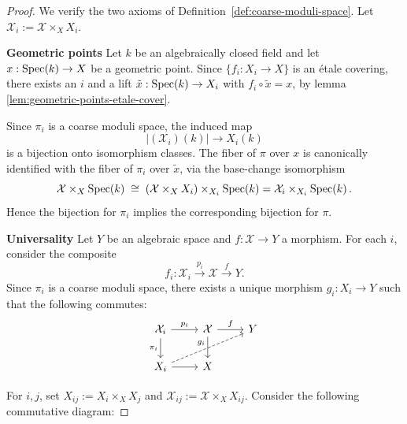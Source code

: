 \begin{proof}
	We verify the two axioms of Definition~\ref{def:coarse-moduli-space}.
	Let $\mathcal{X}_i := \mathcal{X} \times_X X_i$.
	
	\textbf{Geometric points}
	Let $k$ be an algebraically closed field and let
	$x : \operatorname{Spec}(k) \to X$ be a geometric point. Since $\{f_i : X_i \to X\}$
	is an étale covering, there exists an  $i$ and a lift
	$\tilde{x} : \operatorname{Spec}(k) \to X_i$ with $f_i \circ \tilde{x} = x$, by lemma \ref{lem:geometric-points-etale-cover}.
	
	Since $\pi_i$ is a coarse moduli space, the induced map
	\[
	|(\mathcal{X}_i)(k)| \longrightarrow X_i(k)
	\]
	is a bijection onto isomorphism classes. The fiber of $\pi$ over $x$
	is canonically identified with the fiber of $\pi_i$ over $\tilde{x}$,
	via the base-change isomorphism
	\[
	\mathcal{X} \times_X \operatorname{Spec}(k)
	\;\cong\;
	(\mathcal{X} \times_X X_i) \times_{X_i} \operatorname{Spec}(k) = \mathcal{X}_i\times_{X_i}\operatorname{Spec}\!\left(k\right).
	\]
	Hence the bijection for $\pi_i$ implies the corresponding bijection for
	$\pi$.
	
	\medskip
	\textbf{Universality}
	Let $Y$ be an algebraic space and $f : \mathcal{X} \to Y$ a morphism.
	For each $i$, consider the composite
	\[
	f_i: \mathcal{X}_i \xrightarrow{\;p_i\;} \mathcal{X}
	\xrightarrow{\;f\;} Y.
	\]
	Since $\pi_i$ is a coarse moduli space, there exists a unique morphism
	$g_i : X_i \to Y$ such that the following commutes:
	\begin{equation}\label{diag:extension-on-etale-cover-of-X}
		\begin{tikzcd}
			{\mathcal{X}_i} & {\mathcal{X}} & Y \\
			{X_i} & X
			\arrow["{p_i}", from=1-1, to=1-2]
			\arrow["{\pi_i}"', from=1-1, to=2-1]
			\arrow["f", from=1-2, to=1-3]
			\arrow[from=1-2, to=2-2]
			\arrow["{g_i}", dashed, from=2-1, to=1-3]
			\arrow[from=2-1, to=2-2]
		\end{tikzcd}
	\end{equation}
	
	For $i,j$, set $X_{ij} := X_i \times_X X_j$ and $\mathcal{X}_{ij} := \mathcal{X}\times_X X_{ij}$. Consider the following commutative diagram:
	

\end{proof}
